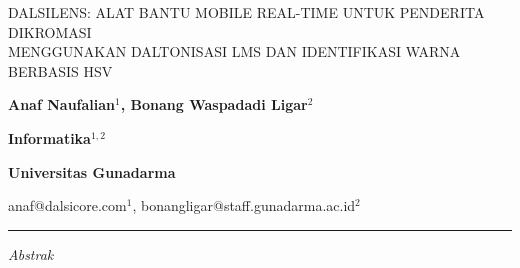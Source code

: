 
\renewcommand{\figurename}{Gambar}
\renewcommand{\tablename}{Tabel}

\begin{center}
  {\bfseries\fontsize{14}{14}\selectfont
  \parbox{1\textwidth}{%
    \centering
    \linespread{1.4}\selectfont
    DALSILENS: ALAT BANTU MOBILE REAL-TIME UNTUK PENDERITA DIKROMASI\\
    MENGGUNAKAN DALTONISASI LMS DAN IDENTIFIKASI WARNA BERBASIS HSV
  }}

  \vspace{0.8em}
  {\fontsize{12}{14}\selectfont\bfseries Anaf Naufalian$^{1}$, Bonang Waspadadi Ligar$^{2}$}

  \vspace{0.5em}
  {\fontsize{11}{13}\selectfont\bfseries Informatika$^{1,2}$}

  \vspace{0.3em}
  {\fontsize{11}{13}\selectfont\bfseries Universitas Gunadarma}

  \vspace{0.3em}
  {\fontsize{10}{12}\selectfont anaf@dalsicore.com$^{1}$, bonangligar@staff.gunadarma.ac.id$^{2}$}
\end{center}

\vspace{0.6em}
\hrule
\vspace{0.8em}

\begin{center}
  {\itshape\fontsize{12}{14}\selectfont Abstrak}
\end{center}

